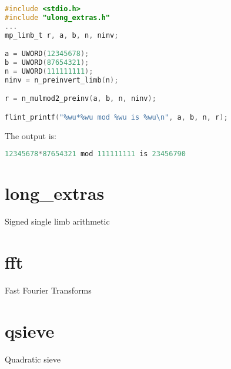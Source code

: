 \documentclass[a4paper,10pt]{book}
\begin{document}
{{\begin{lstlisting}[language=c]
#include <stdio.h>
#include "ulong_extras.h"
...
mp_limb_t r, a, b, n, ninv;

a = UWORD(12345678);
b = UWORD(87654321);
n = UWORD(111111111);
ninv = n_preinvert_limb(n);

r = n_mulmod2_preinv(a, b, n, ninv);

flint_printf("%wu*%wu mod %wu is %wu\n", a, b, n, r);
\end{lstlisting}

The output is:
\begin{lstlisting}[language=c]
12345678*87654321 mod 111111111 is 23456790
\end{lstlisting}




\chapter{long\_extras}
\epigraph{Signed single limb arithmetic}{}




\chapter{fft}
\epigraph{Fast Fourier Transforms}{}




\chapter{qsieve}
\epigraph{Quadratic sieve}{}

}}
\end{document}
